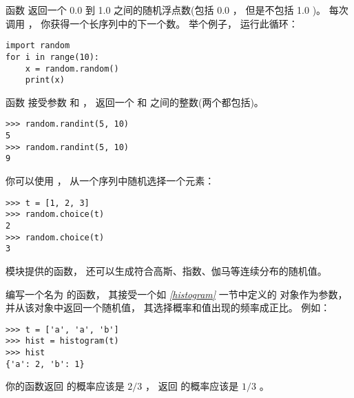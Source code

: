 函数  返回一个 0.0 到 1.0 之间的随机浮点数(包括 0.0 ， 但是不包括 1.0 )。    每次调用  ， 你获得一个长序列中的下一个数。
举个例子， 运行此循环：

\begin{lstlisting}
import random
for i in range(10):
    x = random.random()
    print(x)
\end{lstlisting}


函数  接受参数  和  ，
返回一个  和  之间的整数(两个都包括)。


\begin{lstlisting}
>>> random.randint(5, 10)
5
>>> random.randint(5, 10)
9
\end{lstlisting}


你可以使用  ， 从一个序列中随机选择一个元素：


\begin{lstlisting}
>>> t = [1, 2, 3]
>>> random.choice(t)
2
>>> random.choice(t)
3
\end{lstlisting}


 模块提供的函数， 还可以生成符合高斯、指数、伽马等连续分布的随机值。

\begin{exercise}


编写一个名为 {\em {}} 的函数，  其接受一个如 {\em \ref{histogram}} 一节中定义的 {\em {}} 对象作为参数，  并从该对象中返回一个随机值，  其选择概率和值出现的频率成正比。   例如：

\begin{em}
\begin{lstlisting}
>>> t = ['a', 'a', 'b']
>>> hist = histogram(t)
>>> hist
{'a': 2, 'b': 1}
\end{lstlisting}
\end{em}


你的函数返回 {\em {}} 的概率应该是 {\em $2/3$} ， 返回 {\em {}} 的概率应该是 {\em $1/3$} 。

\end{exercise}

